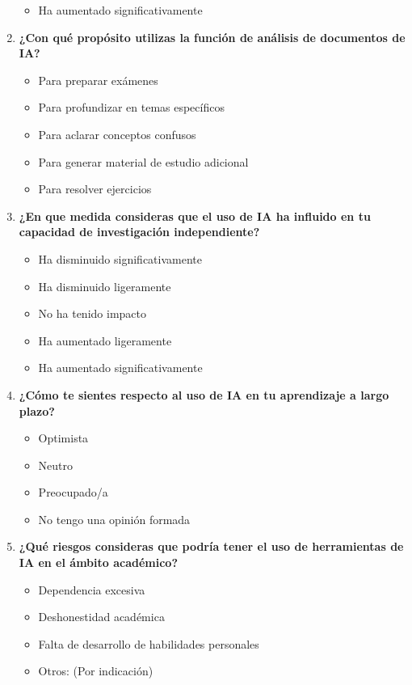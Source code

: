 \documentclass{article}
\newenvironment{recoleccionDeInformacion}{}{}
\begin{document}
\begin{recoleccionDeInformacion}
\begin{multicols}{2}
\begin{enumerate}
\begin{itemize}
        \item Ha aumentado significativamente
      \end{itemize}
      \item \textbf{¿Con  qué  propósito  utilizas  la  función  de  análisis  de  documentos  de  IA?}
      \begin{itemize}
        \item Para preparar exámenes
        \item Para profundizar en temas específicos
        \item Para aclarar conceptos confusos
        \item Para generar material de estudio adicional
        \item Para resolver ejercicios
      \end{itemize}
      \item \textbf{¿En que medida consideras que el uso de IA  ha influido en tu capacidad de investigación independiente?}
      \begin{itemize}
        \item Ha disminuido significativamente
        \item Ha disminuido ligeramente
        \item No ha tenido impacto
        \item Ha aumentado ligeramente
        \item Ha aumentado significativamente
      \end{itemize}
      \item \textbf{¿Cómo te sientes respecto al uso de IA en tu aprendizaje a largo plazo?}
      \begin{itemize}
        \item Optimista
        \item Neutro
        \item Preocupado/a
        \item No tengo una opinión formada
      \end{itemize}
      \item \textbf{¿Qué riesgos consideras que podría tener el uso de herramientas de IA en el ámbito académico?}
      \begin{itemize}
        \item Dependencia excesiva
        \item Deshonestidad académica
        \item Falta de desarrollo de habilidades personales
        \item Otros: (Por indicación) 

\end{itemize}
\end{enumerate}
\end{multicols}
\end{recoleccionDeInformacion}
\end{document}
